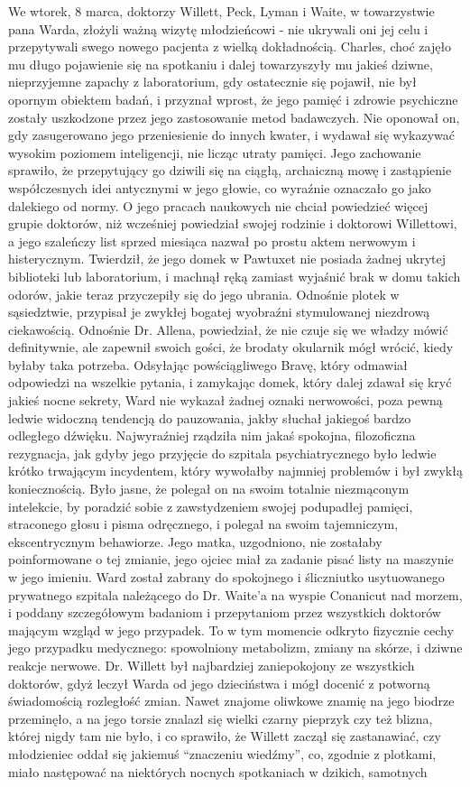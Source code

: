 We wtorek, 8 marca, doktorzy Willett, Peck, Lyman i Waite, w towarzystwie pana Warda, złożyli ważną wizytę młodzieńcowi - nie ukrywali oni jej celu i przepytywali swego nowego pacjenta z wielką dokładnością. Charles, choć zajęło mu długo pojawienie się na spotkaniu i dalej towarzyszyły mu jakieś dziwne, nieprzyjemne zapachy z laboratorium, gdy ostatecznie się pojawił, nie był opornym obiektem badań, i przyznał wprost, że jego pamięć i zdrowie psychiczne zostały uszkodzone przez jego zastosowanie metod badawczych. Nie oponował on, gdy zasugerowano jego przeniesienie do innych kwater, i wydawał się wykazywać wysokim poziomem inteligencji, nie licząc utraty pamięci. Jego zachowanie sprawiło, że przepytujący go dziwili się na ciągłą, archaiczną mowę i zastąpienie współczesnych idei antycznymi w jego głowie, co wyraźnie oznaczało go jako dalekiego od normy. O jego pracach naukowych nie chciał powiedzieć więcej grupie doktorów, niż wcześniej powiedział swojej rodzinie i doktorowi Willettowi, a jego szaleńczy list sprzed miesiąca nazwał po prostu aktem nerwowym i histerycznym. Twierdził, że jego domek w Pawtuxet nie posiada żadnej ukrytej biblioteki lub laboratorium, i machnął ręką zamiast wyjaśnić brak w domu takich odorów, jakie teraz przyczepiły się do jego ubrania. Odnośnie plotek w sąsiedztwie, przypisał je zwykłej bogatej wyobraźni stymulowanej niezdrową ciekawością. Odnośnie Dr. Allena, powiedział, że nie czuje się we władzy mówić definitywnie, ale zapewnił swoich gości, że brodaty okularnik mógł wrócić, kiedy byłaby taka potrzeba. Odsyłając powściągliwego Bravę, który odmawiał odpowiedzi na wszelkie pytania, i zamykając domek, który dalej zdawał się kryć jakieś nocne sekrety, Ward nie wykazał żadnej oznaki nerwowości, poza pewną ledwie widoczną tendencją do pauzowania, jakby słuchał jakiegoś bardzo odległego dźwięku. Najwyraźniej rządziła nim jakaś spokojna, filozoficzna rezygnacja, jak gdyby jego przyjęcie do szpitala psychiatrycznego było ledwie krótko trwającym incydentem, który wywołałby najmniej problemów i był zwykłą koniecznością. Było jasne, że polegał on na swoim totalnie niezmąconym intelekcie, by poradzić sobie z zawstydzeniem swojej podupadłej pamięci, straconego głosu i pisma odręcznego, i polegał na swoim tajemniczym, ekscentrycznym behawiorze. Jego matka, uzgodniono, nie zostałaby poinformowane o tej zmianie, jego ojciec miał za zadanie pisać listy na maszynie w jego imieniu. Ward został zabrany do spokojnego i śliczniutko usytuowanego prywatnego szpitala należącego do Dr. Waite'a na wyspie Conanicut nad morzem, i poddany szczegółowym badaniom i przepytaniom przez wszystkich doktorów mającym wzgląd w jego przypadek. To w tym momencie odkryto fizycznie cechy jego przypadku medycznego: spowolniony metabolizm, zmiany na skórze, i dziwne reakcje nerwowe. Dr. Willett był najbardziej zaniepokojony ze wszystkich doktorów, gdyż leczył Warda od jego dzieciństwa i mógł docenić z potworną świadomością rozległość zmian. Nawet znajome oliwkowe znamię na jego biodrze przeminęło, a na jego torsie znalazł się wielki czarny pieprzyk czy też blizna, której nigdy tam nie było, i co sprawiło, że Willett zaczął się zastanawiać, czy młodzieniec oddał się jakiemuś ``znaczeniu wiedźmy'', co, zgodnie z plotkami, miało następować na niektórych nocnych spotkaniach w dzikich, samotnych 